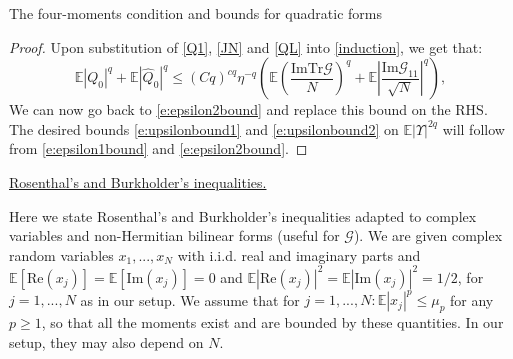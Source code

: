 \documentclass[11pt, a4paper, oneside]{book}
\numberwithin{equation}{chapter}
\newcommand{\E}{\mathbb E}
\newcommand{\Tr}{\mathrm{Tr}}
\begin{document}
\begin{section}{The four-moments condition and bounds for quadratic forms}
\begin{proof}
Upon substitution of \eqref{Q1}, \eqref{JN} and \eqref{QL} into \eqref{induction}, we get that:
%
\begin{equation}\label{e:Q0bound}
\E |Q_0|^q +\E |\widehat{Q}_0|^q\leq (Cq)^{cq}\eta^{-q}\left( \E\left(\frac{\mathrm{Im} \Tr \mathcal{G}  }{N}\right)^{q} + \E\left|\frac{\mathrm{Im} \mathcal{G} _{11}}{\sqrt N}\right|^{q}\right),
\end{equation} 
%
We can now go back to \eqref{e:epsilon2bound} and replace this bound on the RHS. The desired bounds \eqref{e:upsilonbound1} and \eqref{e:upsilonbound2} on $\E |\Upsilon|^{2q}$  will follow from \eqref{e:epsilon1bound} and \eqref{e:epsilon2bound}.
\end{proof}

\pagebreak

\underline{Rosenthal's and Burkholder's inequalities.}

Here we state Rosenthal's and Burkholder's inequalities adapted to complex variables and non-Hermitian bilinear forms (useful for $\mathcal G$). We are given complex random variables $x_1, ..., x_N$ with i.i.d. real and imaginary parts and $\E \left [ \mathrm{Re} (x_j) \right ] = \E \left [ \mathrm{Im} (x_j) \right ] = 0$ and $\E \left | \mathrm{Re} (x_j) \right |^2 = \E \left | \mathrm{Im} (x_j) \right |^2 = 1/2$, for $j=1,...,N$ as in our setup. We assume that for $j=1,...,N: \E |x_j|^p \leq \mu_{p}$ for any $p\geq 1$, so that all the moments exist and are bounded by these quantities. In our setup, they may also depend on $N.$


\end{section}
\end{document}

